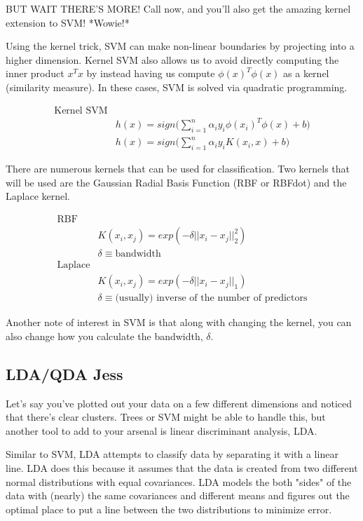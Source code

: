 \documentclass[a4paper]{article}
\begin{document}
BUT WAIT THERE'S MORE! Call now, and you'll also get the amazing kernel extension to SVM! *Wowie!*

Using the kernel trick, SVM can make non-linear boundaries by projecting into a higher dimension. Kernel SVM also allows us to avoid directly computing the inner product $x^Tx$ by instead having us compute $\phi(x)^T\phi(x)$ as a kernel (similarity measure). In these cases, SVM is solved via quadratic programming. %


\begin{align*}
\text{Kernel SVM} \\
& h(x)=sign\Bigg(\sum_{i=1}^n\alpha_iy_i\phi(x_i)^T\phi(x)+b\Bigg)\\
&h(x)=sign\Bigg(\sum_{i=1}^n\alpha_iy_iK(x_i,x)+b\Bigg)
\end{align*}

There are numerous kernels that can be used for classification. Two kernels that will be used are the Gaussian Radial Basis Function (RBF or RBFdot) and the Laplace kernel.

\begin{align*}
\text{RBF} \\
& K(x_i,x_j)=exp(-\delta||x_i-x_j||_2^2)\\
&\delta\equiv\text{bandwidth}\\
\text{Laplace} \\
& K(x_i,x_j)=exp(-\delta||x_i-x_j||_1)\\
&\delta\equiv \text{(usually) inverse of the number of predictors}
\end{align*}

Another note of interest in SVM is that along with changing the kernel, you can also change how you calculate the bandwidth, $\delta$.  

\subsection{LDA/QDA \textbf{Jess}}

Let's say you've plotted out your data on a few different dimensions and noticed that there's clear clusters. Trees or SVM might be able to handle this, but another tool to add to your arsenal is linear discriminant analysis, LDA.

Similar to SVM, LDA attempts to classify data by separating it with a linear line. LDA does this because it assumes that the data is created from two different normal distributions with equal covariances. LDA models the both "sides" of the data with (nearly) the same covariances and different means and figures out the optimal place to put a line between the two distributions to minimize error.
\end{document}
